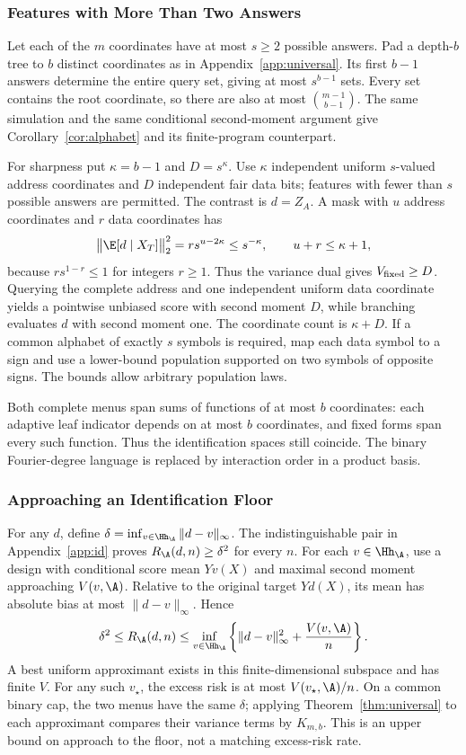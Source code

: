 \subsubsection{Features with More Than Two Answers}\label{app:alphabet}
Let each of the $m$ coordinates have at most $s\ge2$ possible answers. Pad a depth-$b$ tree to $b$ distinct coordinates as in Appendix~\ref{app:universal}. Its first $b-1$ answers determine the entire query set, giving at most $s^{b-1}$ sets. Every set contains the root coordinate, so there are also at most $\binom{m-1}{b-1}$. The same simulation and the same conditional second-moment argument give Corollary~\ref{cor:alphabet} and its finite-program counterpart.

For sharpness put $\kappa=b-1$ and $D=s^\kappa$. Use $\kappa$ independent uniform $s$-valued address coordinates and $D$ independent fair data bits; features with fewer than $s$ possible answers are permitted. The contrast is $d=Z_A$. A mask with $u$ address coordinates and $r$ data coordinates has
\[
 \big\|\E[d\mid X_T]\big\|_2^2=r s^{u-2\kappa}\le s^{-\kappa},\qquad u+r\le \kappa+1,
\]
because $r s^{1-r}\le1$ for integers $r\ge1$. Thus the variance dual gives $V_{\rm fixed}\ge D$. Querying the complete address and one independent uniform data coordinate yields a pointwise unbiased score with second moment $D$, while branching evaluates $d$ with second moment one. The coordinate count is $\kappa+D$. If a common alphabet of exactly $s$ symbols is required, map each data symbol to a sign and use a lower-bound population supported on two symbols of opposite signs. The bounds allow arbitrary population laws.

Both complete menus span sums of functions of at most $b$ coordinates: each adaptive leaf indicator depends on at most $b$ coordinates, and fixed forms span every such function. Thus the identification spaces still coincide. The binary Fourier-degree language is replaced by interaction order in a product basis.

\subsubsection{Approaching an Identification Floor}\label{app:floor-rate}
For any $d$, define $\delta=\inf_{v\in\Hh_\A}\|d-v\|_\infty$. The indistinguishable pair in Appendix~\ref{app:id} proves $R_\A(d,n)\ge\delta^2$ for every $n$. For each $v\in\Hh_\A$, use a design with conditional score mean $Yv(X)$ and maximal second moment approaching $V(v,\A)$. Relative to the original target $Yd(X)$, its mean has absolute bias at most $\|d-v\|_\infty$. Hence
\begin{equation}
 \delta^2\le R_\A(d,n)
 \le\inf_{v\in\Hh_\A}\left\{\|d-v\|_\infty^2+\frac{V(v,\A)}n\right\}.
 \label{eq:floor-envelope}
\end{equation}
A best uniform approximant exists in this finite-dimensional subspace and has finite $V$. For any such $v_\star$, the excess risk is at most $V(v_\star,\A)/n$. On a common binary cap, the two menus have the same $\delta$; applying Theorem~\ref{thm:universal} to each approximant compares their variance terms by $K_{m,b}$. This is an upper bound on approach to the floor, not a matching excess-risk rate.

